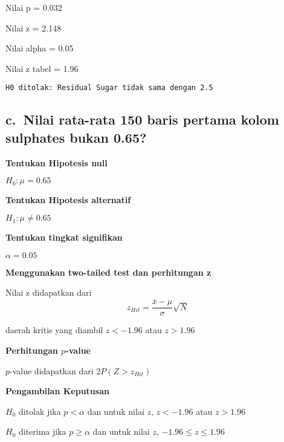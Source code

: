 \documentclass[11pt]{article}
\begin{document}
    Nilai p = 0.032

    
    Nilai z = 2.148

    
    Nilai alpha = 0.05

    
    Nilai z tabel = 1.96

    
    \begin{Verbatim}[commandchars=\\\{\}]
H0 ditolak: Residual Sugar tidak sama dengan 2.5
    \end{Verbatim}

    \hypertarget{c.-nilai-rata-rata-150-baris-pertama-kolom-sulphates-bukan-0.65}{%
\subsection{c.~Nilai rata-rata 150 baris pertama kolom sulphates bukan
0.65?}\label{c.-nilai-rata-rata-150-baris-pertama-kolom-sulphates-bukan-0.65}}

    \textbf{Tentukan Hipotesis null}

\(H_0 : \mu = 0.65\)

\textbf{Tentukan Hipotesis alternatif}

\(H_1 : \mu \neq 0.65\)

\textbf{Tentukan tingkat signifikan}

\(\alpha = 0.05\)

\textbf{Menggunakan two-tailed test dan perhitungan z}

Nilai z didapatkan dari
\[ z_{Hit} = \frac{\bar{x}-\mu}{\sigma}  \sqrt{N}\]

daerah kritis yang diambil \(z < -1.96\) atau \(z > 1.96\)

\textbf{Perhitungan \(p\)-value}

\(p\)-value didapatkan dari \(2P(Z>z_{Hit})\)

\textbf{Pengambilan Keputusan}

\(H_0\) ditolak jika \(p < \alpha\) dan untuk nilai \(z\), \(z < -1.96\)
atau \(z > 1.96\)

\(H_0\) diterima jika \(p \geq \alpha\) dan untuk nilai \(z\),
\(-1.96 \leq z \leq 1.96\)
\end{document}
